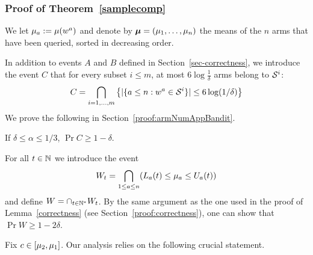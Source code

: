 \subsubsection{Proof of Theorem~\ref{samplecomp}} \label{sec-proof}

We let $\mu_a := \mu(w^a)$ and
denote by $\bm{\mu} = (\mu_1,\dots,\mu_n)$ the means of the $n$ arms that have been queried, sorted in decreasing order. 

In addition to events $A$ and $B$ defined in Section~\ref{sec-correctness}, we introduce the event $C$ that for every subset $i \leq m$, at most $6\log\frac{1}{\delta}$
        arms belong to $\mathcal{S}^{i}$:
\begin{align}
C = \bigcap_{i = 1,\dots,m} \left\{|\{ a \leq n : w^a \in \mathcal{S}^{i}\}| \leq 6\log({1}/{\delta})\right\}
\end{align}
We prove the following in
Section~\ref{proof:armNumAppBandit}.

\begin{lemma}\label{lem-armNumAppBandit} If $\delta \leq \alpha \leq 1/3$,
$\Pr{ C } \geq 1-\delta$.
\end{lemma}

For all $t\in\mathbb{N}$ we introduce the event 
\begin{align}
W_t = \bigcap_{1\leq a \leq n} (L_a(t) \leq \mu_a \leq U_a(t))
\end{align}
and define $W = \cap_{t\in\mathbb{N}^*} W_t$. By the same argument as the one used in the proof of Lemma~\ref{correctness} (see
Section~\ref{proof:correctness}),
one 
can show that $\Pr{ W } \geq 1-2\delta.$

Fix $c \in [\mu_2,\mu_1]$. Our analysis relies on the following crucial statement.

